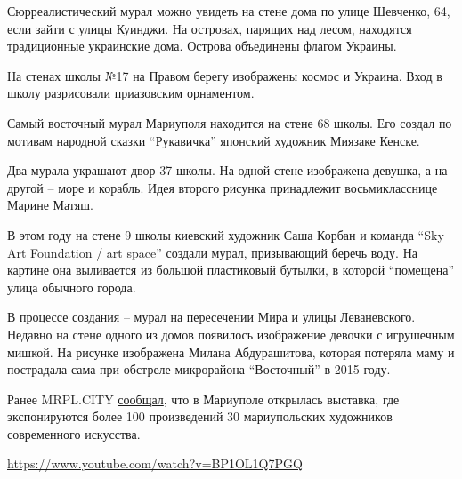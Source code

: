 Сюрреалистический мурал можно увидеть на стене дома по улице Шевченко, 64, если
зайти с улицы Куинджи. На островах, парящих над лесом, находятся традиционные
украинские дома. Острова объединены флагом Украины.


На стенах школы №17 на Правом берегу изображены космос и Украина. Вход в школу
разрисовали приазовским орнаментом.


Самый восточный мурал Мариуполя находится на стене 68 школы. Его создал по
мотивам народной сказки \enquote{Рукавичка} японский художник Миязаке Кенске.


Два мурала украшают двор 37 школы. На одной стене изображена девушка, а на
другой – море и корабль. Идея второго рисунка принадлежит восьмикласснице
Марине Матяш.


В этом году на стене 9 школы киевский художник Саша Корбан и команда \enquote{Sky Art
Foundation / art space} создали мурал, призывающий беречь воду. На картине она
выливается из большой пластиковый бутылки, в которой \enquote{помещена} улица обычного
города.


В процессе создания – мурал на пересечении Мира и улицы Леваневского. Недавно
на стене одного из домов появилось изображение девочки с игрушечным мишкой. На
рисунке изображена Милана Абдурашитова, которая потеряла маму и пострадала сама
при обстреле микрорайона \enquote{Восточный} в 2015 году.


Ранее MRPL.CITY
\href{https://mrpl.city/news/view/zhkh-art-v-mariupole-kak-zhiteli-ukrashayut-dvory-foto-plusvideo}{сообщал},
что в Мариуполе открылась выставка, где экспонируются более 100 произведений 30
мариупольских художников современного искусства.

\url{https://www.youtube.com/watch?v=BP1OL1Q7PGQ}

